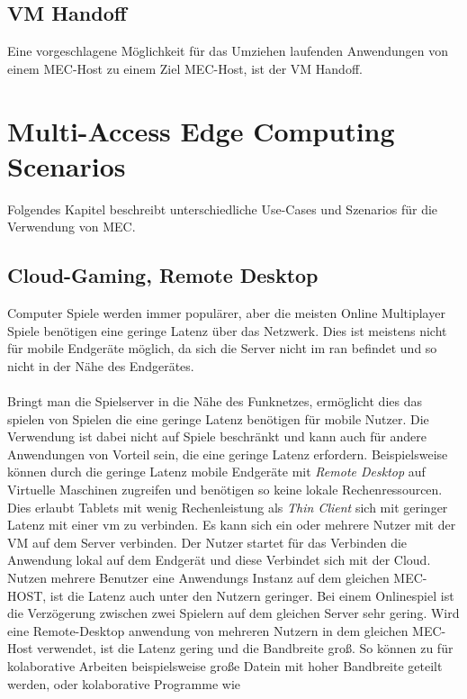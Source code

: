 \documentclass[runningheads]{llncs}
\numberwithin{figure}{section}
\begin{document}
\subsection{VM Handoff}
Eine vorgeschlagene Möglichkeit \cite{etsiETSIGSMEC} für das Umziehen laufenden Anwendungen von einem MEC-Host zu einem Ziel MEC-Host, 
ist der VM Handoff. \cite{Ha2015AdaptiveVH}
\newpage

\section{Multi-Access Edge Computing Scenarios}
\label{sec:Anwendungen}
Folgendes Kapitel beschreibt unterschiedliche Use-Cases und Szenarios für die Verwendung von MEC.\cite{patelContributorHuaweiVice}
\subsection{Cloud-Gaming, Remote Desktop}
\label{subsec:Cloud-Gaming}
Computer Spiele werden immer populärer, aber die meisten Online Multiplayer Spiele benötigen eine geringe 
Latenz über das Netzwerk. Dies ist meistens nicht für mobile Endgeräte möglich, da sich die Server nicht im \acrshort{ran} befindet und so
nicht in der Nähe des Endgerätes.
\\
\\
Bringt man die Spielserver in die Nähe des Funknetzes, ermöglicht dies das spielen von Spielen die eine geringe Latenz benötigen
für mobile Nutzer. 
Die Verwendung ist dabei nicht auf Spiele beschränkt und kann auch für andere Anwendungen von Vorteil sein, 
die eine geringe Latenz erfordern. Beispielsweise können durch die geringe Latenz mobile Endgeräte mit \textit{Remote Desktop} auf
Virtuelle Maschinen zugreifen und benötigen so keine lokale Rechenressourcen. Dies erlaubt Tablets mit wenig Rechenleistung als 
\textit{Thin Client} sich mit geringer Latenz mit einer \acrshort{vm} zu verbinden.
Es kann sich ein oder mehrere Nutzer mit der VM auf dem Server verbinden. 
Der Nutzer startet für das Verbinden
die Anwendung lokal auf dem Endgerät und diese Verbindet sich mit der Cloud. Nutzen mehrere Benutzer eine Anwendungs Instanz auf dem 
gleichen MEC-HOST, ist die Latenz auch unter den Nutzern geringer. Bei einem Onlinespiel ist die Verzögerung zwischen zwei Spielern
auf dem gleichen Server sehr gering. Wird eine Remote-Desktop anwendung von mehreren Nutzern in dem gleichen MEC-Host verwendet, 
ist die Latenz gering und die Bandbreite groß. 
So können zu für kolaborative Arbeiten beispielsweise große Datein mit hoher Bandbreite geteilt werden, oder kolaborative Programme wie
\end{document}
